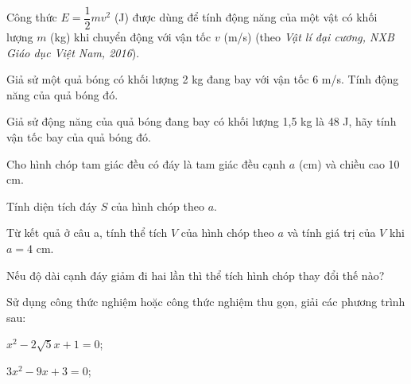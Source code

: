 \begin{exercises}
\begin{questions}[resume=SGK]
        \item Công thức $E=\dfrac{1}{2}mv^2$ (J) được dùng để tính động năng của một vật có khối lượng $m$ (kg) khi chuyển động với vận tốc $v$ (m/s) (theo \textit{Vật lí đại cương, NXB Giáo dục Việt Nam, 2016}).
        \begin{questions}
            \item Giả sử một quả bóng có khối lượng 2 kg đang bay với vận tốc 6 m/s. Tính động năng của quả bóng đó.

            \answerline
            \answerline

            \item Giả sử động năng của quả bóng đang bay có khối lượng 1,5 kg là 48 J, hãy tính vận tốc bay của quả bóng đó.

            \answerline
            \answerline
        \end{questions}

        \item Cho hình chóp tam giác đều có đáy là tam giác đều cạnh $a$ (cm) và chiều cao 10 cm.
        \begin{questions}
            \item Tính diện tích đáy $S$ của hình chóp theo $a$.

            \answerline
            \answerline

            \item Từ kết quả ở câu a, tính thể tích $V$ của hình chóp theo $a$ và tính giá trị của $V$ khi $a=4$ cm.

            \answerline
            \answerline

            \item Nếu độ dài cạnh đáy giảm đi hai lần thì thể tích hình chóp thay đổi thế nào?

            \answerline
            \answerline
        \end{questions}

        \item Sử dụng công thức nghiệm hoặc công thức nghiệm thu gọn, giải các phương trình sau:
        \begin{questions}
            \item $x^2-2\sqrt{5}x+1=0$;

            \answerline
            \answerline

            \item $3x^2-9x+3=0$;

            \answerline
            \answerline


\end{questions}
\end{questions}
\end{exercises}
